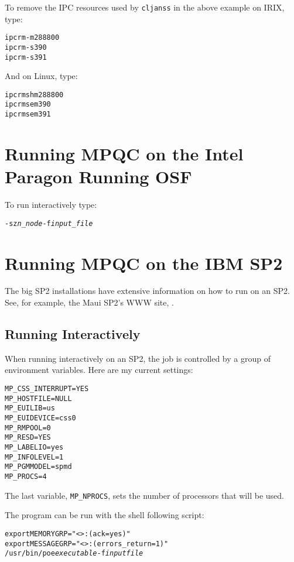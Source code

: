 To remove the IPC resources used by \verb|cljanss| in
the above example on IRIX, type:

\begin{alltt}
ipcrm -m 288800
ipcrm -s 390
ipcrm -s 391
\end{alltt}

And on Linux, type:

\begin{alltt}
ipcrm shm 288800
ipcrm sem 390
ipcrm sem 391
\end{alltt}

\section{Running MPQC on the Intel Paragon Running OSF}

To run interactively type:
\begin{alltt}
 -sz {\itshape n_node} -f {\itshape input_file}
\end{alltt}

\section{Running MPQC on the IBM SP2}

The big SP2 installations have extensive information on
how to run on an SP2.  See, for example, the Maui SP2's
WWW site, .

\subsection{Running Interactively}

When running interactively on an SP2,
the job is controlled by a group of environment variables.
Here are my current settings:
\begin{alltt}
MP_CSS_INTERRUPT=YES
MP_HOSTFILE=NULL
MP_EUILIB=us
MP_EUIDEVICE=css0
MP_RMPOOL=0
MP_RESD=YES
MP_LABELIO=yes
MP_INFOLEVEL=1
MP_PGMMODEL=spmd
MP_PROCS=4
\end{alltt}
The last variable, \verb|MP_NPROCS|, sets the number
of processors that will be used.

The program can be run with the shell following  script:

\begin{alltt}
export MEMORYGRP="<>:(ack=yes)"
export MESSAGEGRP="<>:(errors_return=1)"
/usr/bin/poe {\itshape executable} -f {\itshape inputfile}
\end{alltt}


